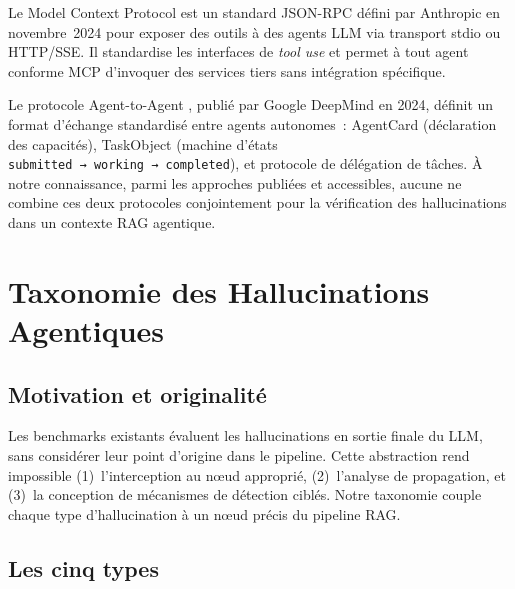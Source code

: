 \documentclass[12pt,a4paper]{article}
\begin{document}
Le Model Context Protocol \cite{anthropic2024mcp} est un standard JSON-RPC défini par Anthropic en novembre~2024 pour exposer des outils à des agents LLM via transport stdio ou HTTP/SSE. Il standardise les interfaces de \textit{tool use} et permet à tout agent conforme MCP d'invoquer des services tiers sans intégration spécifique.

Le protocole Agent-to-Agent \cite{google2024a2a}, publié par Google DeepMind en 2024, définit un format d'échange standardisé entre agents autonomes~: AgentCard (déclaration des capacités), TaskObject (machine d'états \texttt{submitted~→~working~→~completed}), et protocole de délégation de tâches. À notre connaissance, parmi les approches publiées et accessibles, aucune ne combine ces deux protocoles conjointement pour la vérification des hallucinations dans un contexte RAG agentique.

\section{Taxonomie des Hallucinations Agentiques}

\subsection{Motivation et originalité}

Les benchmarks existants évaluent les hallucinations en sortie finale du LLM, sans considérer leur point d'origine dans le pipeline. Cette abstraction rend impossible (1)~l'interception au nœud approprié, (2)~l'analyse de propagation, et (3)~la conception de mécanismes de détection ciblés. Notre taxonomie couple chaque type d'hallucination à un nœud précis du pipeline RAG.

\subsection{Les cinq types}
\end{document}

